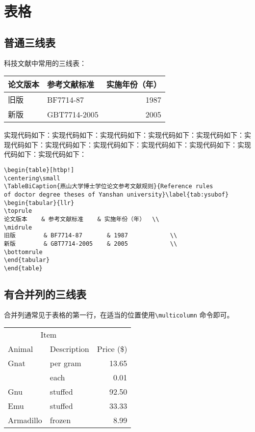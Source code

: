 \chapter{表格}
\label{chap:table}

\section{普通三线表}\label{section3-1}
科技文献中常用的三线表：
\begin{table}[htbp!]
 \centering\small
  \label{tab:ysubof}
 \begin{tabular}{llr}
 \toprule
    论文版本    & 参考文献标准    & 实施年份（年）  \\
 \midrule
    旧版        & BF7714-87       & 1987            \\
    新版        & GBT7714-2005    & 2005            \\
 \bottomrule
 \end{tabular}
\end{table}

实现代码如下：实现代码如下：实现代码如下：实现代码如下：实现代码如下：实现代码如下：实现代码如下：实现代码如下：实现代码如下：实现代码如下：实现代码如下：实现代码如下：
\begin{verbatim}
\begin{table}[htbp!]
\centering\small
\TableBiCaption{燕山大学博士学位论文参考文献规则}{Reference rules
of doctor degree theses of Yanshan university}\label{tab:ysubof}
\begin{tabular}{llr}
\toprule
论文版本    & 参考文献标准    & 实施年份（年）  \\
\midrule
旧版        & BF7714-87       & 1987            \\
新版        & GBT7714-2005    & 2005            \\
\bottomrule
\end{tabular}
\end{table}
\end{verbatim}

\section{有合并列的三线表}\label{section3-2}
合并列通常见于表格的第一行，在适当的位置使用\verb|\multicolumn| 命令即可。
\begin{table}[htbp!]
\centering\small
{}\label{tab:test}
\begin{tabular}{llr} \toprule
\multicolumn{2}{c}{Item} \\ \cmidrule(r){1-2}
Animal & Description & Price (\$)\\ \midrule
Gnat & per gram & 13.65 \\
& each & 0.01 \\
Gnu & stuffed & 92.50 \\
Emu & stuffed & 33.33 \\
Armadillo & frozen & 8.99 \\ \bottomrule
\end{tabular}
\end{table}


